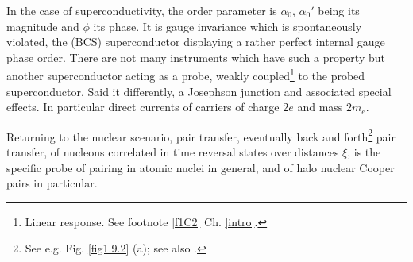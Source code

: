 In the case of superconductivity, the order parameter is $\alpha_0$, $\alpha_0'$ being its magnitude and $\phi$ its phase. It is gauge invariance which is spontaneously violated, the (BCS) superconductor displaying a rather perfect internal gauge phase order. There are not many instruments which have such a property but another superconductor acting as a probe, weakly coupled\footnote{ Linear response. See footnote \ref{f1C2} Ch. \ref{intro}.} to the probed superconductor. Said it differently, a Josephson junction and associated special effects. In particular direct currents of carriers of charge $2e$ and mass $2m_e$.


Returning to the nuclear scenario, pair transfer, eventually back and forth\footnote{See e.g. Fig. \ref{fig1.9.2} (a); see also \cite{Potel:21}.} pair transfer, of nucleons correlated in time reversal states over distances $\xi$, is the specific probe of pairing in atomic nuclei in general, and of halo nuclear Cooper pairs in particular.

